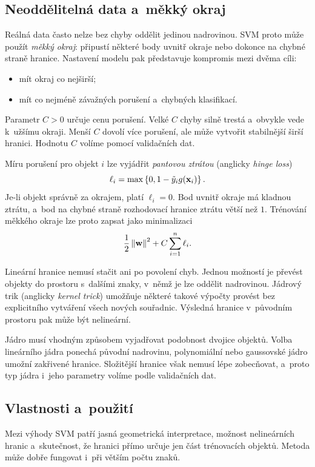 \subsection{Neoddělitelná data a~měkký okraj}

Reálná data často nelze bez chyby oddělit jedinou nadrovinou. SVM proto může použít \emph{měkký okraj}: připustí některé body uvnitř okraje nebo dokonce na chybné straně hranice. Nastavení modelu pak představuje kompromis mezi dvěma cíli:
\begin{itemize}
    \item mít okraj co nejširší;
    \item mít co nejméně závažných porušení a~chybných klasifikací.
\end{itemize}
Parametr \(C>0\) určuje cenu porušení. Velké \(C\) chyby silně trestá a~obvykle vede k~užšímu okraji. Menší \(C\) dovolí více porušení, ale může vytvořit stabilnější širší hranici. Hodnotu \(C\) volíme pomocí validačních dat.

Míru porušení pro objekt \(i\) lze vyjádřit \emph{pantovou ztrátou} (anglicky \emph{hinge loss})
\[
    \ell_i
    =
    \max\left\{0,1-\tilde y_i g(\mathbf{x}_i)\right\}.
\]
Je-li objekt správně za okrajem, platí \(\ell_i=0\). Bod uvnitř okraje má kladnou ztrátu, a~bod na chybné straně rozhodovací hranice ztrátu větší než \(1\). Trénování měkkého okraje lze proto zapsat jako minimalizaci
\[
    \frac12\left\lVert\mathbf{w}\right\rVert^2
    +
    C\sum_{i=1}^{n}\ell_i.
\]

Lineární hranice nemusí stačit ani po povolení chyb. Jednou možností je převést objekty do prostoru s~dalšími znaky, v~němž je lze oddělit nadrovinou. Jádrový trik (anglicky \emph{kernel trick}) umožňuje některé takové výpočty provést bez explicitního vytváření všech nových souřadnic. Výsledná hranice v~původním prostoru pak může být nelineární.

Jádro musí vhodným způsobem vyjadřovat podobnost dvojice objektů. Volba lineárního jádra ponechá původní nadrovinu, polynomiální nebo gaussovské jádro umožní zakřivené hranice. Složitější hranice však nemusí lépe zobecňovat, a~proto typ jádra i~jeho parametry volíme podle validačních dat.

\subsection{Vlastnosti a~použití}

Mezi výhody SVM patří jasná geometrická interpretace, možnost nelineárních hranic a~skutečnost, že hranici přímo určuje jen část trénovacích objektů. Metoda může dobře fungovat i~při větším počtu znaků.

